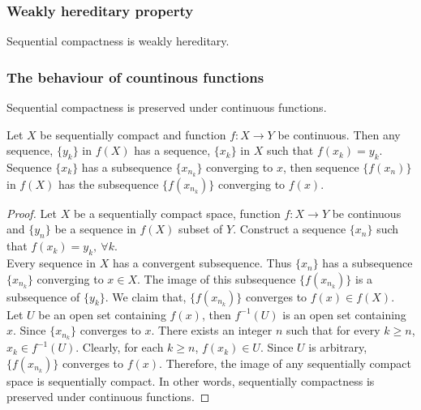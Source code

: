 \subsubsection{Weakly hereditary property}
\begin{theorem}
	Sequential compactness is weakly hereditary.\cite[Exercises 11.1.3]{joshi}
\end{theorem}

\subsubsection{The behaviour of countinous functions}
\begin{theorem}
	Sequential compactness is preserved under continuous functions.\cite[Exercises 11.1.4]{joshi}
\end{theorem}
\begin{synopsis}
	Let $X$ be sequentially compact and function $f : X \to Y$ be continuous. Then any sequence, $\{y_k\}$ in $f(X)$ has a sequence, $\{x_k\}$ in $X$ such that $f(x_k) = y_k$. Sequence $\{x_k\}$ has a subsequence $\{x_{n_k}\}$ converging to $x$, then sequence $\{ f(x_n)\}$ in $f(X)$ has the subsequence $\{f(x_{n_k})\}$ converging to $f(x)$.
\end{synopsis}
\begin{proof}
	Let $X$ be a sequentially compact space, function $f: X \to Y$ be continuous and $\{y_n\}$ be a sequence in $f(X)$ subset of $Y$. Construct a sequence $\{x_n\}$ such that $f(x_k) = y_k,\ \forall k$.\\

	Every sequence in $X$ has a convergent subsequence. Thus $\{x_n\}$ has a subsequence $\{x_{n_k}\}$ converging to $x \in X$. The image of this subsequence $\{f(x_{n_k})\}$ is a subsequence of $\{y_k\}$. We claim that, $\{f(x_{n_k})\}$ converges to $f(x) \in f(X)$.\\

	Let $U$ be an open set containing $f(x)$, then $f^{-1}(U)$ is an open set containing $x$. Since $\{x_{n_k}\}$ converges to $x$. There exists an integer $n$ such that for every $k \ge n$, $x_k \in f^{-1}(U)$. Clearly, for each $k \ge n$, $f(x_k) \in U$. Since $U$ is arbitrary, $\{ f(x_{n_k})\}$ converges to $f(x)$. Therefore, the image of any sequentially compact space is sequentially compact. In other words, sequentially compactness is preserved under continuous functions.
\end{proof}

